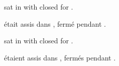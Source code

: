 \documentclass{article}
\begin{document}

 sat in  with  closed for .

 était assis dans ,  fermé pendant .

 sat in  with  closed for .

 étaient assis dans , 
fermés pendant .

\printunsrtglossaries
\end{document}

